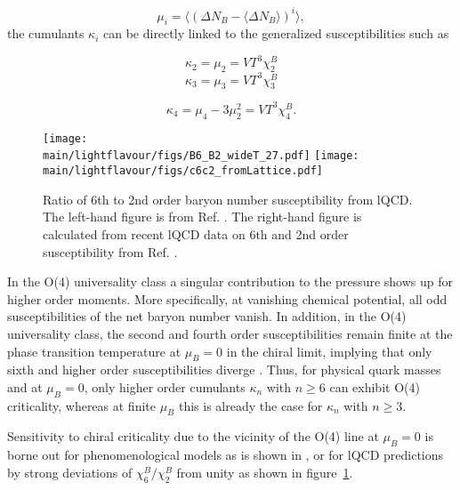 \begin{equation}
\mu_i = \langle (\Delta N_B - \langle \Delta N_B \rangle )^i \rangle ,
\end{equation}
the cumulants $\kappa_i$ can be directly linked to the generalized susceptibilities such as

\begin{equation}
\kappa_2 = \mu_2 = VT^3 \chi_2^B
\end{equation}
\begin{equation}
\kappa_3 = \mu_3 = VT^3 \chi_3^B  
\end{equation}

\begin{equation}
\kappa_4 = \mu_4 - 3\mu_2^2 = VT^3 \chi_4^B.
\end{equation}


\begin{figure}[h]
\begin{center}
\texttt{[image: \\main/lightflavour/figs/B6\_B2\_wideT\_27.pdf]}
\texttt{[image: \\main/lightflavour/figs/c6c2\_fromLattice.pdf]}
\end{center}
\caption{Ratio of 6th to 2nd order baryon number susceptibility from lQCD. The left-hand figure is from Ref. \cite{Bazavov:2017dus}. The right-hand figure is calculated  from recent lQCD data on  6th and  2nd  order susceptibility from Ref.  \cite{Borsanyi:2018grb}.  }  
\label{fig:chi62}
\end{figure}

In the O(4) universality class a singular contribution to the pressure shows up for higher order  moments.
More specifically, at vanishing chemical potential, all odd susceptibilities of the net baryon number vanish.  In addition, in the O(4) universality class, the second and fourth order susceptibilities remain finite  at  the  phase  transition  temperature  at $\mu_B=  0$  in  the  chiral  limit,
implying  that  only  sixth  and  higher  order  susceptibilities  diverge \cite{Ejiri:2005wq,Friman:2011pf}. Thus, for  physical  quark  masses and at $\mu_B=0$,  only  higher  order  cumulants $\kappa_n$ with $n\geq 6$ can exhibit   O(4) criticality,  whereas at finite $\mu_B$ this is already the case for $\kappa_n$ with $n\geq 3$.  

Sensitivity to chiral criticality due to the vicinity of the O(4) line    at $\mu_B=0$ is borne out for phenomenological models as is shown in \cite{Friman:2011pf,Almasi:2017bhq}, or for lQCD predictions \cite{Bazavov:2017dus,Borsanyi:2018grb} by strong deviations of $\chi_6^B/\chi_2^B$ from unity as shown in figure~\ref{fig:chi62}.

